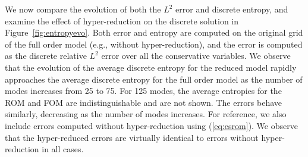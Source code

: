 \documentclass[preprint,10pt]{elsarticle}
\theoremstyle{definition}
\theoremstyle{lemma}
\theoremstyle{theorem}
\theoremstyle{assumption}
\begin{document}
We now compare the evolution of both the $L^2$ error and discrete entropy, and examine the effect of hyper-reduction on the discrete solution in Figure~\ref{fig:entropyevo}.  Both error and entropy are computed on the original grid of the full order model (e.g., without hyper-reduction), and the error is computed as the discrete relative $L^2$ error over all the conservative variables.  We observe that the evolution of the average discrete entropy for the reduced model rapidly approaches the average discrete entropy for the full order model as the number of modes increases from 25 to 75.  For 125 modes, the average entropies for the ROM and FOM are indistinguishable and are not shown.  The errors behave similarly, decreasing as the number of modes increases.  For reference, we also include errors computed without hyper-reduction using (\ref{eq:esrom}).  We observe that the hyper-reduced errors are virtually identical to errors without hyper-reduction in all cases.
\end{document}
